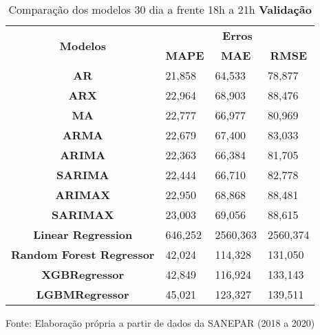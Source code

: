 \begin{table}[H]
	\centering
	\caption{Comparação dos modelos 30 dia a frente 18h a 21h \textbf{Validação} }\label{tb:30-18vld}
	\begin{tabular}{@{}clll@{}}
		\toprule
		\multirow{2}{*}{\textbf{Modelos}} & \multicolumn{3}{c}{\textbf{Erros}}                                                                       \\ \cmidrule(l){2-4} 
		& \multicolumn{1}{c}{\textbf{MAPE}} & \multicolumn{1}{c}{\textbf{MAE}} & \multicolumn{1}{c}{\textbf{RMSE}} \\ \hline
\textbf{AR}                       & 21,858                            & 64,533                           & 78,877                            \\
\textbf{ARX}                      & 22,964                            & 68,903                           & 88,476                            \\
\textbf{MA}                       & 22,777                            & 66,977                           & 80,969                            \\
\textbf{ARMA}                     & 22,679                            & 67,400                           & 83,033                            \\
\textbf{ARIMA}                    & 22,363                            & 66,384                           & 81,705                            \\
\textbf{SARIMA}                   & 22,444                            & 66,710                           & 82,778                            \\
\textbf{ARIMAX}                   & 22,950                            & 68,868                           & 88,481                            \\
\textbf{SARIMAX}                  & 23,003                            & 69,056                           & 88,615                            \\
\textbf{Linear Regression}        & 646,252                           & 2560,363                         & 2560,374                          \\
\textbf{Random Forest Regressor}  & 42,024                            & 114,328                          & 131,050                           \\
\textbf{XGBRegressor}             & 42,849                            & 116,924                          & 133,143                           \\
\textbf{LGBMRegressor}            & 45,021                            & 123,327                          & 139,511                           \\ \bottomrule
	\end{tabular}

Fonte: Elaboração própria a partir de dados da SANEPAR (2018 a 2020)
\end{table}


